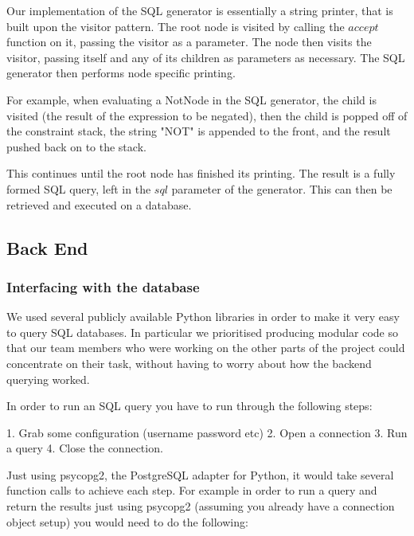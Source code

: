 \documentclass[a4paper, 11pt]{article}
\begin{document}
        Our implementation of the SQL generator is essentially a string
        printer, that is built upon the visitor pattern. The root node is
        visited by calling the $accept$ function on it, passing the visitor as
        a parameter. The node then visits the visitor, passing itself and any
        of its children as parameters as necessary. The SQL generator then
        performs node specific printing. 

        For example, when evaluating a NotNode in the SQL generator, the child
        is visited (the result of the expression to be negated), then the child
        is popped off of the constraint stack, the string "NOT" is appended to
        the front, and the result pushed back on to the stack.

        This continues until the root node has finished its printing. The
        result is a fully formed SQL query, left in the $sql$ parameter of the
        generator. This can then be retrieved and executed on a database.

    \subsection{Back End}


    \subsubsection{Interfacing with the database}

      We used several publicly available Python libraries in order to make 
      it very easy to query SQL databases. In particular we prioritised
      producing modular code so that our team members who were working on the
      other parts of the project could concentrate on their task, without having
      to worry about how the backend querying worked.

      In order to run an SQL query you have to run through the following steps:

      1. Grab some configuration (username password etc)
      2. Open a connection
      3. Run a query
      4. Close the connection.

      Just using psycopg2, the PostgreSQL adapter for Python, it would take
      several function calls to achieve each step. For example in order to run a
      query and return the results just using psycopg2 (assuming you already
      have a connection object setup) you would need to do the following:
\end{document}
